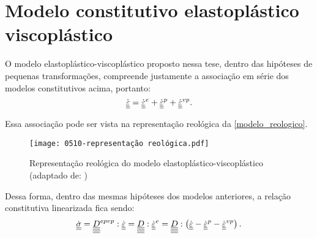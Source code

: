 \section{Modelo constitutivo elastoplástico viscoplástico}
O modelo elastoplástico-viscoplástico proposto nessa tese, dentro das hipóteses de pequenas transformações, compreende justamente a associação em série dos modelos constitutivos acima, portanto:
\begin{equation}
	\label{eq:decomposicao_deformacoes_epvp}
	\dot {\underline{\underline \varepsilon}} = \dot {\underline{\underline \varepsilon}}^e + \dot {\underline{\underline \varepsilon}}^{p} + \dot {\underline{\underline \varepsilon}}^{vp}.
\end{equation}

Essa associação pode ser vista na representação reológica da \autoref{modelo_reologico}.
\begin{figure}[H]
	\begin{center}
		\texttt{[image: 0510-representação reológica.pdf]}
	\end{center}
	\caption{\label{modelo_reologico}Representação reológica do modelo elastoplástico-viscoplástico (adaptado de: )}
\end{figure}
Dessa forma, dentro das mesmas hipóteses dos modelos anteriores, a relação constitutiva linearizada fica sendo:
\begin{equation}
	\label{eq:lei_epvp}
	\dot {\underline{\underline \sigma}} = \underline{\underline{\underline{\underline D}}}^{epvp}:\dot {\underline{\underline \varepsilon}} = \underline{\underline{\underline{\underline D}}}:\dot {\underline{\underline \varepsilon}}^e = \underline{\underline{\underline{\underline D}}}:\left(\dot {\underline{\underline \varepsilon}} - \dot {\underline{\underline \varepsilon}}^{p} - \dot {\underline{\underline \varepsilon}}^{vp} \right).
\end{equation}

